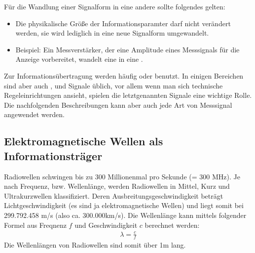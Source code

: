 \documentclass[letterpaper,10pt,english]{jupyterBook}
\begin{document}
\sphinxAtStartPar
Für die Wandlung einer Signalform in eine andere sollte folgendes gelten:
\begin{itemize}
\item {} 
\sphinxAtStartPar
Die physikalische Größe der Informationsparamter darf nicht verändert werden, sie wird lediglich in eine neue Signalform umgewandelt.

\item {} 
\sphinxAtStartPar
Beispiel: Ein Messverstärker, der eine Amplitude eines Messsignals für die Anzeige vorbereitet, wandelt eine  in eine .

\end{itemize}

\sphinxAtStartPar
Zur Informationsübertragung werden häufig  oder  benutzt. In einigen Bereichen sind aber auch ,  und  Signale üblich, vor allem wenn man sich technische Regeleinrichtungen ansieht, spielen die letztgenannten Signale eine wichtige Rolle. Die nachfolgenden Beschreibungen kann aber auch jede Art von Messsignal angewendet werden.

\sphinxAtStartPar
{}


\subsection{Elektromagnetische Wellen als Informationsträger}
\label{\detokenize{content/3_basics:elektromagnetische-wellen-als-informationstrager}}
\sphinxAtStartPar
Radiowellen schwingen bis zu 300 Millionen\sphinxhyphen{}mal pro Sekunde (= 300 MHz). Je nach Frequenz, bzw. Wellenlänge, werden Radiowellen in Mittel\sphinxhyphen{}, Kurz\sphinxhyphen{} und Ultrakurzwellen klassifiziert. Deren Ausbreitungsgeschwindigkeit beträgt Lichtgeschwindigkeit (es sind ja elektromagnetische Wellen) und liegt somit bei 299.792.458 m/s (also ca. 300.000km/s). Die Wellenlänge kann mittels folgender Formel aus Freqnenz \(f\) und Geschwindigkeit \(c\) berechnet werden:
\begin{equation*}
\begin{split} \lambda = \frac{c}{f}\end{split}
\end{equation*}
\sphinxAtStartPar
Die Wellenlängen von Radiowellen sind somit über 1m lang.
\end{document}
